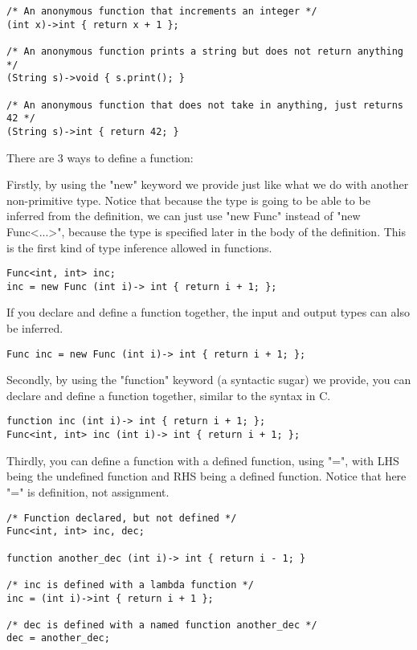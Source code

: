 \documentclass[11pt,A4]{article}
\begin{document}
\begin{lstlisting}
/* An anonymous function that increments an integer */
(int x)->int { return x + 1 }; 

/* An anonymous function prints a string but does not return anything */
(String s)->void { s.print(); }

/* An anonymous function that does not take in anything, just returns 42 */
(String s)->int { return 42; }
\end{lstlisting}

There are 3 ways to define a function: 

Firstly, by using the "new" keyword we provide just like what we do with another non-primitive type. Notice that because the type is going to be able to be inferred from the definition, we can just use "new Func" instead of "new Func<...>", because the type is specified later in the body of the definition. This is the first kind of type inference allowed in functions.

\begin{lstlisting}
Func<int, int> inc;
inc = new Func (int i)-> int { return i + 1; };
\end{lstlisting}


If you declare and define a function together, the input and output types can also be inferred.

\begin{lstlisting}
Func inc = new Func (int i)-> int { return i + 1; };
\end{lstlisting}




Secondly, by using the "function" keyword (a syntactic sugar) we provide, you can declare and define a function together, similar to the syntax in C.
\begin{lstlisting}
function inc (int i)-> int { return i + 1; };
Func<int, int> inc (int i)-> int { return i + 1; };
\end{lstlisting}

Thirdly, you can define a function with a defined function, using "=", with LHS being the undefined function and RHS being a defined function. Notice that here "=" is definition, not assignment.
\begin{lstlisting}
/* Function declared, but not defined */
Func<int, int> inc, dec;

function another_dec (int i)-> int { return i - 1; }

/* inc is defined with a lambda function */
inc = (int i)->int { return i + 1 }; 

/* dec is defined with a named function another_dec */
dec = another_dec;


\end{lstlisting}
\end{document}
